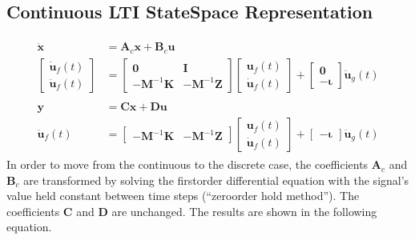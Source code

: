 \documentclass[letterpaper,10pt,english]{sphinxmanual}
\begin{document}
\subsection{Continuous LTI State\sphinxhyphen{}Space Representation}
\label{\detokenize{theory/statespace:continuous-lti-state-space-representation}}\begin{equation*}
\begin{split}\begin{aligned}
    \mathbf{\dot{x}} &= \mathbf{A}_{c}\mathbf{x} + \mathbf{B}_{c}\mathbf{u} \\
    \begin{bmatrix} \mathbf{\dot{u}}_{f}(t) \\ \mathbf{\ddot{u}}_{f}(t) \end{bmatrix}
    &=
    \begin{bmatrix} \mathbf{0} & \mathbf{I} \\ -\mathbf{M}^{-1}\mathbf{K} & -\mathbf{M}^{-1}\mathbf{Z} \end{bmatrix}
    \begin{bmatrix} \mathbf{u}_{f}(t) \\ \mathbf{\dot{u}}_{f}(t) \end{bmatrix}
    +
    \begin{bmatrix} \mathbf{0} \\ -\mathbf{\iota} \end{bmatrix}
    \mathbf{\ddot{u}}_{g}(t) \\ \\
    \mathbf{y} &= \mathbf{Cx} + \mathbf{Du} \\
    \mathbf{\ddot{u}}_{f}(t) &=
    \begin{bmatrix} -\mathbf{M}^{-1}\mathbf{K} & -\mathbf{M}^{-1}\mathbf{Z} \end{bmatrix}
    \begin{bmatrix} \mathbf{u}_{f}(t) \\ \mathbf{\dot{u}}_{f}(t) \end{bmatrix}
    +
    \begin{bmatrix} -\mathbf{\iota} \end{bmatrix}
    \mathbf{\ddot{u}}_{g}(t)
\end{aligned}\end{split}
\end{equation*}
\sphinxAtStartPar
In order to move from the continuous to the discrete case, the
coefficients \(\mathbf{A}_{c}\) and \(\mathbf{B}_{c}\) are
transformed by solving the first\sphinxhyphen{}order differential equation with the
signal’s value held constant between time steps (“zero\sphinxhyphen{}order hold
method”). The coefficients \(\mathbf{C}\) and \(\mathbf{D}\) are
unchanged. The results are shown in the following equation.
\end{document}
